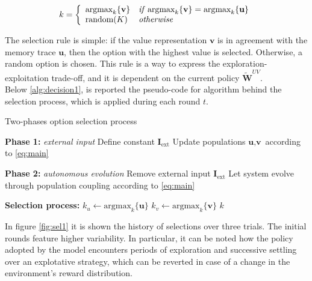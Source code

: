 \begin{equation*}
    k =
    \left\{
        \begin{array}{ll}
            \text{argmax}_{k}\{\textbf{v}\} & \text{\textit{if}}\; \text{argmax}_{k} \{\textbf{v}\} = \text{argmax}_{k} \{\textbf{u}\} \\
            \text{random}(K) & \text{\textit{otherwise}}
        \end{array}
    \right.
\end{equation*}

\noindent The selection rule is simple: if the value representation $\textbf{v}$ is in agreement with the memory trace $\textbf{u}$, then the option with the highest value is selected. Otherwise, a random option is chosen.
This rule is a way to express the exploration-exploitation trade-off, and it is dependent on the current policy $\tilde{\textbf{W}}^{UV}$. \\ Below \ref{alg:decision1}, is reported the pseudo-code for algorithm behind the selection process, which is applied during each round $t$.

\begin{algorithm}[ht]
\caption{Two-phases option selection process}
\label{alg:decision}
\SetAlgoLined
{}


\textbf{Phase 1:} \textit{external input} 
Define constant $\textbf{I}_{\text{ext}}$\;
Update populations $\textbf{u}, \textbf{v}$ according to \ref{eq:main}\;

\textbf{Phase 2:} \textit{autonomous evolution} 
Remove external input $\textbf{I}_{\text{ext}}$\;
Let system evolve through population coupling according to \ref{eq:main}\;

\textbf{Selection process:}\;
$k_{u} \gets \text{argmax}_{k}\{\textbf{u}\}$\;
$k_{v} \gets \text{argmax}_{k}\{\textbf{v}\}$\;
\Return $k$
\end{algorithm}\label{alg:decision1}

\noindent In figure \ref{fig:sel1} it is shown the history of selections over three trials. The initial rounds feature higher variability. In particular, it can be noted how the policy adopted by the model encounters periods of exploration and successive settling over an explotative strategy, which can be reverted in case of a change in the environment's reward distribution.

